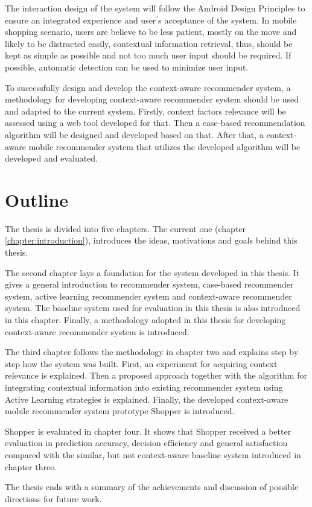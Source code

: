 The interaction design of the system will follow the Android Design Principles \cite{ref:43} to ensure an integrated experience and user$^\prime$s acceptance of the system. In mobile shopping scenario, users are believe to be less patient, mostly on the move and likely to be distracted easily, contextual information retrieval, thus, should be kept as simple as possible and not too much user input should be required. If possible, automatic detection can be used to minimize user input.

To successfully design and develop the context-aware recommender system, a methodology for developing context-aware recommender system \cite{ref:5} should be used and adapted to the current system. Firstly, context factors relevance will be assessed using a web tool developed for that. Then a case-based recommendation algorithm will be designed and developed based on that. After that, a context-aware mobile recommender system that utilizes the developed algorithm will be developed and evaluated.

\section{Outline} \label{sec:ol}

The thesis is divided into five chapters. The current one (chapter \ref{chapter:introduction}), introduces the ideas, motivations and goals behind this thesis.

The second chapter lays a foundation for the system developed in this thesis. It gives a general introduction to recommender system, case-based recommender system, active learning recommender system and context-aware recommender system. The baseline system used for evaluation in this thesis is also introduced in this chapter. Finally, a methodology adopted in this thesis for developing context-aware recommender system is introduced.

The third chapter follows the methodology in chapter two and explains step by step how the system was built. First, an experiment for acquiring context relevance is explained. Then a proposed approach together with the algorithm for integrating contextual information into existing recommender system using Active Learning strategies is explained. Finally, the developed context-aware mobile recommender system prototype Shopper is introduced. 

Shopper is evaluated in chapter four. It shows that Shopper received a better evaluation in prediction accuracy, decision efficiency and general satisfaction compared with the similar, but not context-aware baseline system introduced in chapter three.

The thesis ends with a summary of the achievements and discussion of possible directions for future work.

